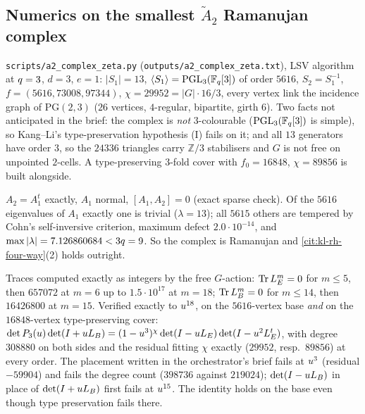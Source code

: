 \subsection{Numerics on the smallest $\tilde A_2$ Ramanujan complex}
\begin{numerical}
\label{num:a2-complex}
\texttt{scripts/a2\_complex\_zeta.py} (\texttt{outputs/a2\_complex\_zeta.txt}),
LSV algorithm at $q = 3$, $d = 3$, $e = 1$: $|S_1| = 13$,
$\langle S_1\rangle = \mathrm{PGL}_3(\mathbb F_q[3])$ of order $5616$, $S_2 = S_1^{-1}$,
$f = (5616, 73008, 97344)$, $\chi = 29952 = |G|\cdot16/3$, every vertex link the
incidence graph of $\mathrm{PG}(2,3)$ ($26$ vertices, $4$-regular, bipartite,
girth $6$). Two facts not anticipated in the brief: the complex is \emph{not}
$3$-colourable ($\mathrm{PGL}_3(\mathbb F_q[3])$ is simple), so Kang--Li's
type-preservation hypothesis (I) fails on it; and all $13$ generators have order
$3$, so the $24336$ triangles carry $\mathbb Z/3$ stabilisers and $G$ is not
free on unpointed $2$-cells. A type-preserving $3$-fold cover with
$f_0 = 16848$, $\chi = 89856$ is built alongside.
\end{numerical}

\begin{numerical}
\label{num:a2-vertex-spectrum}
$A_2 = A_1^t$ exactly, $A_1$ normal, $[A_1,A_2] = 0$ (exact sparse check). Of
the $5616$ eigenvalues of $A_1$ exactly one is trivial ($\lambda = 13$); all
$5615$ others are tempered by Cohn's self-inversive criterion, maximum defect
$2.0\cdot10^{-14}$, and $\max|\lambda| = 7.126860684 < 3q = 9$. So the complex
is Ramanujan and \cref{cit:kl-rh-four-way}(2) holds outright.
\end{numerical}

\begin{numerical}
\label{num:a2-identity}
Traces computed exactly as integers by the free $G$-action: $\operatorname{Tr} L_E^m = 0$ for
$m\le5$, then $657072$ at $m = 6$ up to $1.5\cdot10^{17}$ at $m = 18$;
$\operatorname{Tr} L_B^m = 0$ for $m\le14$, then $16426800$ at $m = 15$. Verified exactly to
$u^{18}$, on the $5616$-vertex base \emph{and} on the $16848$-vertex
type-preserving cover:
$\det P_3(u)\det(I+u L_B) = (1-u^3)^{\chi}\det(I-u L_E)\det(I-u^2L_E^t)$,
with degree $308880$ on both sides and the residual fitting $\chi$ exactly
($29952$, resp.\ $89856$) at every order. The placement written in the
orchestrator's brief fails at $u^3$ (residual $-59904$) and fails the degree
count ($398736$ against $219024$); $\det(I-u L_B)$ in place of
$\det(I+u L_B)$ first fails at $u^{15}$. The identity holds on the base even
though type preservation fails there.
\end{numerical}

